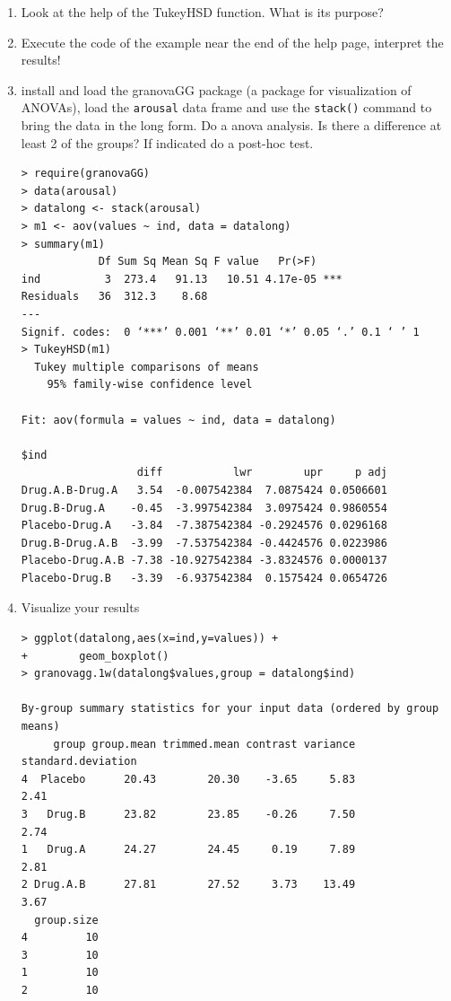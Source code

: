 \begin{frame}
  \begin{enumerate}
  \item Look at the help of the TukeyHSD function. What is its purpose? 
  \item Execute the code of the example near the end of the help page, interpret the results!
  \item install and load the granovaGG package (a package for visualization of ANOVAs), load the \texttt{arousal} data frame and use the \texttt{stack()} command to bring the data in the long form. Do a anova analysis. Is there a difference at least 2 of the groups? If indicated do a post-hoc test.\scriptsize
\begin{verbatim}
> require(granovaGG)
> data(arousal)
> datalong <- stack(arousal)
> m1 <- aov(values ~ ind, data = datalong)
> summary(m1)
            Df Sum Sq Mean Sq F value   Pr(>F)    
ind          3  273.4   91.13   10.51 4.17e-05 ***
Residuals   36  312.3    8.68                     
---
Signif. codes:  0 ‘***’ 0.001 ‘**’ 0.01 ‘*’ 0.05 ‘.’ 0.1 ‘ ’ 1
> TukeyHSD(m1)
  Tukey multiple comparisons of means
    95% family-wise confidence level

Fit: aov(formula = values ~ ind, data = datalong)

$ind
                  diff           lwr        upr     p adj
Drug.A.B-Drug.A   3.54  -0.007542384  7.0875424 0.0506601
Drug.B-Drug.A    -0.45  -3.997542384  3.0975424 0.9860554
Placebo-Drug.A   -3.84  -7.387542384 -0.2924576 0.0296168
Drug.B-Drug.A.B  -3.99  -7.537542384 -0.4424576 0.0223986
Placebo-Drug.A.B -7.38 -10.927542384 -3.8324576 0.0000137
Placebo-Drug.B   -3.39  -6.937542384  0.1575424 0.0654726
\end{verbatim}\normalsize
  \item Visualize your results\scriptsize
\begin{verbatim}
> ggplot(datalong,aes(x=ind,y=values)) + 
+        geom_boxplot()  
> granovagg.1w(datalong$values,group = datalong$ind)

By-group summary statistics for your input data (ordered by group means)
     group group.mean trimmed.mean contrast variance standard.deviation
4  Placebo      20.43        20.30    -3.65     5.83               2.41
3   Drug.B      23.82        23.85    -0.26     7.50               2.74
1   Drug.A      24.27        24.45     0.19     7.89               2.81
2 Drug.A.B      27.81        27.52     3.73    13.49               3.67
  group.size
4         10
3         10
1         10
2         10


\end{verbatim}
\end{enumerate}
\end{frame}
